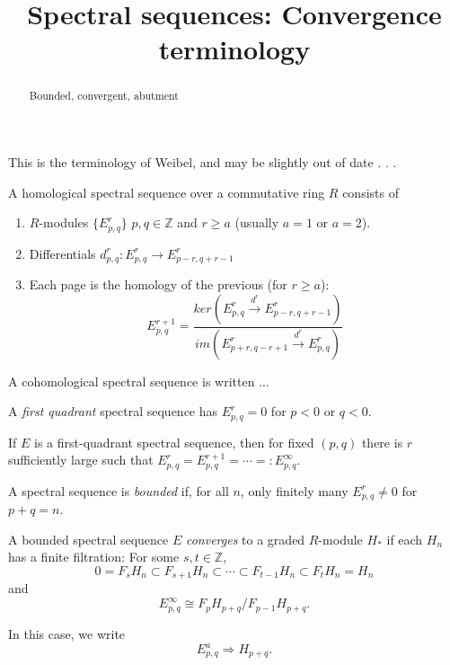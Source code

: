 \documentclass{ximera}
\title{Spectral sequences: Convergence terminology}
\begin{document}
\begin{abstract}
  Bounded, convergent, abutment
\end{abstract}
\maketitle

\begin{note}
  This is the terminology of Weibel, and may be slightly out of date . . .
\end{note}

\begin{definition}
  A homological spectral sequence over a commutative ring $R$ consists of
  \begin{enumerate}
  \item $R$-modules $\{E^r_{p,q}\}$ $p,q \in \mathbb{Z}$ and $r \ge a$ (usually $a = 1$ or $a = 2$).
  \item Differentials $d^r_{p,q}: E^r_{p,q} \to E^r_{p-r, q + r - 1}$
  \item Each page is the homology of the previous (for $r \ge a$):
    \[
    E^{r+1}_{p,q} = \frac{ker\left( E^r_{p,q} \xrightarrow{d^r} E^r_{p-r,q+r - 1} \right)}{im\left( E^r_{p+r,q-r+1} \xrightarrow{d^r} E^r_{p,q} \right)}
    \]
  \end{enumerate}
\end{definition}

\begin{note}
  A cohomological spectral sequence is written ...
\end{note}

\begin{definition}
  A \emph{first quadrant} spectral sequence has $E^r_{p,q} = 0$ for $p
  < 0$ or $q < 0$.
\end{definition}

If $E$ is a first-quadrant spectral sequence, then for fixed $(p,q)$
there is $r$ sufficiently large such that $E^r_{p,q} = E^{r+1}_{p,q} =
\cdots =: E^\infty_{p,q}$.

\begin{definition}
  A spectral sequence is \emph{bounded} if, for all $n$, only finitely
  many $E^r_{p,q} \not = 0$ for $p + q = n$.
\end{definition}

\begin{definition}
  A bounded spectral sequence $E$ \emph{converges} to a graded
  $R$-module $H_*$ if each $H_n$ has a finite filtration: For some $s,t \in \mathbb{Z}$, 
  \[
  0 = F_sH_n \subset F_{s+1}H_n \subset \cdots \subset F_{t-1}H_n \subset F_t H_n = H_n
  \]
  and
  \[
  E^{\infty}_{p,q} \cong F_pH_{p+q}/F_{p-1}H_{p+q}.
  \]
  
  In this case, we write
  \[
  E^a_{p,q} \Rightarrow H_{p+q}.
  \]
\end{definition}
\end{document}
